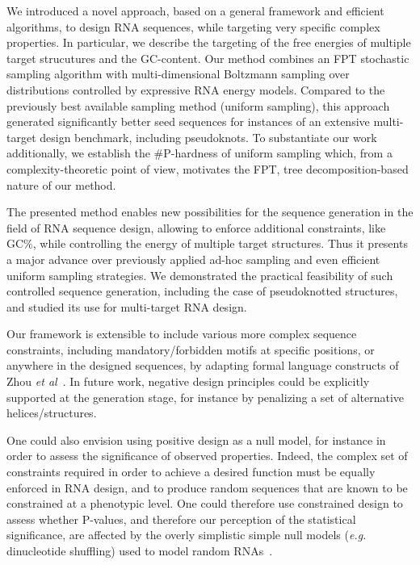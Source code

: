 \documentclass[twocolumn]{bmcart}%
\newcommand{\Nuc}[1]{{\sf #1}}
\newcommand{\Cb}{\Nuc{C}}
\newcommand{\Gb}{\Nuc{G}}
\newcommand{\GCb}{\Gb\Cb}
\newcommand{\citet}[1]{\cite{#1}}
\begin{document}
We introduced a novel approach, based on a general framework and efficient algorithms, to design RNA
sequences, while targeting very specific complex properties. In particular, we describe the targeting of the free energies of multiple target strucutures and the \GCb-content.
Our method combines an FPT stochastic sampling algorithm
with multi-dimensional Boltzmann sampling over distributions
controlled by expressive RNA energy models. Compared to the
previously best available sampling method (uniform sampling), this
approach generated significantly better seed sequences for instances
of an extensive multi-target design benchmark, including pseudoknots.
%
To substantiate our work additionally, we establish the $\#${\sf P}-hardness of uniform sampling which,
from a complexity-theoretic point of view, motivates the FPT, tree decomposition-based nature of our method.  

The presented method enables new possibilities for the sequence generation
in the field of RNA sequence design, allowing to enforce additional
constraints, like \GCb\%, while controlling the energy of
multiple target structures. Thus it presents a major advance over
previously applied ad-hoc sampling and even efficient uniform sampling
strategies. We demonstrated the practical feasibility of such controlled sequence
generation, including the case of pseudoknotted structures, and studied its use for multi-target RNA design.

Our framework is extensible to include various more complex sequence constraints, including mandatory/forbidden motifs at specific
positions, or anywhere in the designed sequences, by adapting formal language constructs
of Zhou \emph{et al}~\citet{Zhou2013}. In future work, negative design principles could 
be explicitly supported at the generation stage, for instance by
penalizing a set of alternative helices/structures.

One could also envision using positive design as a null model, for instance in order to assess the significance of observed properties. Indeed, the complex set of constraints required in order to achieve a desired function must be equally enforced in RNA design, and to produce random sequences that are known to be constrained at a phenotypic level. One could therefore use constrained design to assess whether P-values, and therefore our perception of the statistical significance, are affected by the overly simplistic simple null models (\emph{e.g.} dinucleotide shuffling) used to model random RNAs~\cite{Rivas2017}.
\end{document}
